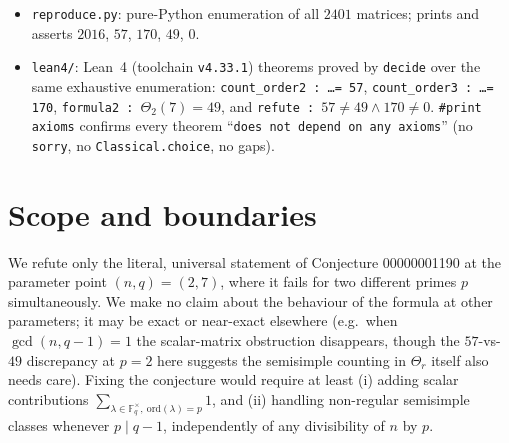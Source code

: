 \documentclass[11pt]{article}
\begin{document}
\begin{itemize}
  \item \texttt{reproduce.py}: pure-Python enumeration of all $2401$ matrices;
        prints and asserts $2016$, $57$, $170$, $49$, $0$.
  \item \texttt{lean4/}: Lean~4 (toolchain \texttt{v4.33.1}) theorems proved by
        \texttt{decide} over the same exhaustive enumeration:
        \texttt{count\_order2 : \ldots = 57},
        \texttt{count\_order3 : \ldots = 170},
        \texttt{formula2 : $\Theta_2(7) = 49$}, and
        \texttt{refute : $57 \ne 49 \wedge 170 \ne 0$}.
        \texttt{\#print axioms} confirms every theorem
        ``\texttt{does not depend on any axioms}'' (no \texttt{sorry}, no
        \texttt{Classical.choice}, no gaps).
\end{itemize}

\section{Scope and boundaries}

We refute only the literal, universal statement of Conjecture 00000001190 at
the parameter point $(n,q) = (2,7)$, where it fails for two different primes
$p$ simultaneously. We make no claim about the behaviour of the formula at
other parameters; it may be exact or near-exact elsewhere (e.g.\ when
$\gcd(n, q-1) = 1$ the scalar-matrix obstruction disappears, though the
$57$-vs-$49$ discrepancy at $p = 2$ here suggests the semisimple counting in
$\Theta_r$ itself also needs care). Fixing the conjecture would require at
least (i) adding scalar contributions $\sum_{\lambda \in \mathbb{F}_q^\times,\
\mathrm{ord}(\lambda) = p} 1$, and (ii) handling non-regular semisimple classes
whenever $p \mid q - 1$, independently of any divisibility of $n$ by $p$.
\end{document}
